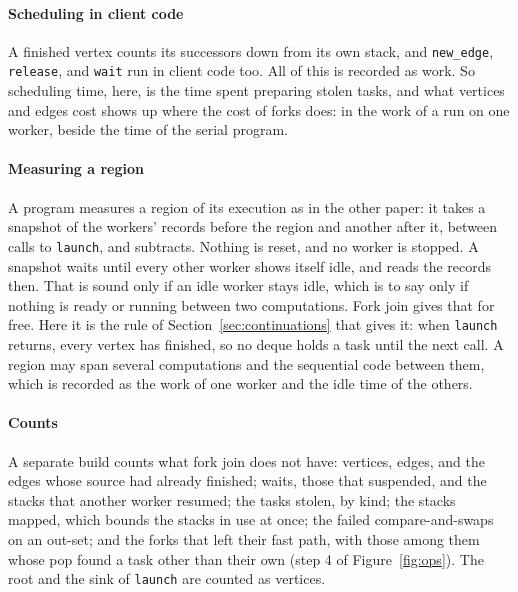 \documentclass[sigplan,nonacm]{acmart}
\begin{document}
\paragraph{Scheduling in client code}
%
A finished vertex counts its successors down from its own stack, and
\lstinline|new_edge|, \lstinline|release|, and \lstinline|wait| run
in client code too.
%
All of this is recorded as work.
%
So scheduling time, here, is the time spent preparing stolen tasks,
and what vertices and edges cost shows up where the cost of forks
does: in the work of a run on one worker, beside the time of the
serial program.

\paragraph{Measuring a region}
%
A program measures a region of its execution as in the other paper:
it takes a snapshot of the workers' records before the region and
another after it, between calls to \lstinline|launch|, and
subtracts.
%
Nothing is reset, and no worker is stopped.
%
A snapshot waits until every other worker shows itself idle, and
reads the records then.
%
That is sound only if an idle worker stays idle, which is to say only
if nothing is ready or running between two computations.
%
Fork join gives that for free.
%
Here it is the rule of Section~\ref{sec:continuations} that gives it:
when \lstinline|launch| returns, every vertex has finished, so no
deque holds a task until the next call.
%
A region may span several computations and the sequential code
between them, which is recorded as the work of one worker and the
idle time of the others.

\paragraph{Counts}
%
A separate build counts what fork join does not have: vertices,
edges, and the edges whose source had already finished; waits, those
that suspended, and the stacks that another worker resumed; the tasks
stolen, by kind; the stacks mapped, which bounds the stacks in use at
once; the failed compare-and-swaps on an out-set; and the forks that
left their fast path, with those among them whose pop found a task
other than their own (step 4 of Figure~\ref{fig:ops}).
%
The root and the sink of \lstinline|launch| are counted as vertices.
\end{document}
